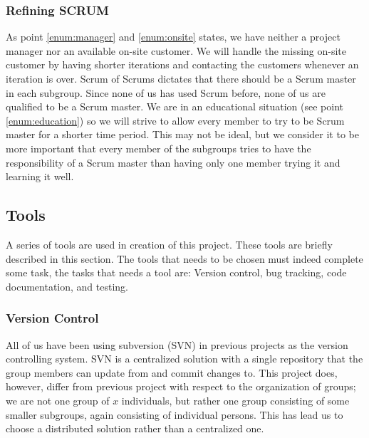 \subsubsection{Refining SCRUM} 
As point \ref{enum:manager} and \ref{enum:onsite} states, we have neither a project manager nor an available on-site customer.
We will handle the missing on-site customer by having shorter iterations and contacting the customers whenever an iteration is over.
Scrum of Scrums dictates that there should be a Scrum master in each subgroup.
Since none of us has used Scrum before, none of us are qualified to be a Scrum master.
We are in an educational situation (see point \ref{enum:education}) so we will strive to allow every member to try to be Scrum master for a shorter time period.
This may not be ideal, but we consider it to be more important that every member of the subgroups tries to have the responsibility of a Scrum master than having only one member trying it and learning it well.

\begin{comment}
There is more:
*Scrum board
*The phases / meetings
**estimation
**sprint planning
*Scrum meetings
*Scrum of scrum def
*project manager problem
\end{comment}


\subsection{Tools}
A series of tools are used in creation of this project.
These tools are briefly described in this section.
The tools that needs to be chosen must indeed complete some task, the tasks that needs a tool are: Version control, bug tracking, code documentation, and testing.

\subsubsection{Version Control}
All of us have been using subversion (SVN) in previous projects as the version controlling system.
SVN is a centralized solution \cite{subversion} with a single repository that the group members can update from and commit changes to.
This project does, however, differ from previous project with respect to the organization of groups; we are not one group of $x$ individuals, but rather one group consisting of some smaller subgroups, again consisting of individual persons.
This has lead us to choose a distributed solution rather than a centralized one.

